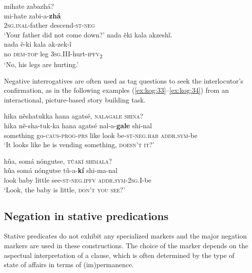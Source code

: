 \documentclass[output=paper,colorlinks,citecolor=brown]{langscibook}
\begin{document}
\ea\label{ex:kog:32}
    \begin{xlist}
    \label{ex:kog:32q}mihate zabazhá?\\
        \gll  mi{}-hate zabi{}-a{}-\textbf{zhá}\\ 
              \textsc{2sg.inal{}-}father descend\textsc{{}-st-neg}\\ 
        \glt  ‘Your father did not come down?’
    \label{ex:kog:32a}nada ẽki kala akzeshĩ.\\
        \gll  nada ẽ-ki kala ak-zek-ĩ\\ 
               no \textsc{dem-top} leg \textsc{3sg.III{}-}hurt-\textsc{ipfv}\textsc{\textsubscript{2}}\\
        \glt ‘No, his legs are hurting.’
    \end{xlist}
\z 

Negative interrogatives are often used as tag questions to seek the interlocutor’s confirmation, as in the following examples (\ref{ex:kog:33}--\ref{ex:kog:34}) from an interactional, picture-based story building task.


\ea\label{ex:kog:33}hika nẽshatukka hana agatsé, \textsc{nalagale shina}?\\
    \gll hika nẽ-sha-tuk-ka hana agatsé nal{}-a-\textbf{gale} shi-nal\\
        something go-\textsc{caus-prog{}-prs} like look be-\textsc{st-neg.hab} \textsc{addr.sym}{}-be\\
    \glt ‘It looks like he is vending something, \textsc{doesn't it}?’ 
\z 

\ea\label{ex:kog:34}hũa, somá nóngutse, \textsc{tũakí shimala}?\\
    \gll hũa somá nóngutse tũ{}-a-\textbf{kí} shi-ma-nal\\
          look baby little see-\textsc{st-neg.ipfv} \textsc{addr.sym-2sg.I}{}-be\\
    \glt‘Look, the baby is little, \textsc{don't you see?}’ 
\z 

\subsection{Negation in stative predications}\label{sec:kog:2.3}

Stative predicates do not exhibit any specialized markers and the major negation markers are used in these constructions. The choice of the marker depends on the aspectual interpretation of a clause, which is often determined by the type of state of affairs in terms of (im)permanence. 
\end{document}
